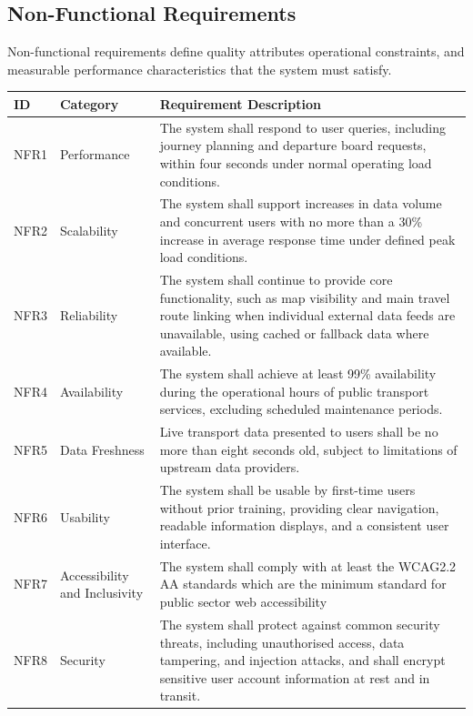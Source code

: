 \documentclass{article}
\begin{document}
\newpage

\subsection{Non-Functional Requirements}
Non-functional requirements define quality attributes operational constraints, and measurable performance characteristics that the system must satisfy. 

\begin{table}[H]
\centering
\renewcommand{\arraystretch}{1.3}
\begin{tabular}{|p{1cm}|p{3cm}|p{13cm}|}
\hline
\textbf{ID} & \textbf{Category} & \textbf{Requirement Description} \\
\hline
NFR1 & Performance &
The system shall respond to user queries, including journey planning and departure board requests, within four seconds under normal operating load conditions. \\
\hline
NFR2 & Scalability &
The system shall support increases in data volume and concurrent users with no more than a 30\% increase in average response time under defined peak load conditions. \\
\hline
NFR3 & Reliability &
The system shall continue to provide core functionality, such as map visibility and main travel route linking when individual external data feeds are unavailable, using cached or fallback data where available. \\
\hline
NFR4 & Availability &
The system shall achieve at least 99\% availability during the operational hours of public transport services, excluding scheduled maintenance periods. \\
\hline
NFR5 & Data Freshness &
Live transport data presented to users shall be no more than eight seconds old, subject to limitations of upstream data providers. \\
\hline
NFR6 & Usability &
The system shall be usable by first-time users without prior training, providing clear navigation, readable information displays, and a consistent user interface. \\
\hline
NFR7 & Accessibility and Inclusivity &
The system shall comply with at least the WCAG2.2 AA standards which are the minimum standard for public sector web accessibility \\
\hline
NFR8 & Security &
The system shall protect against common security threats, including unauthorised access, data tampering, and injection attacks, and shall encrypt sensitive user account information at rest and in transit. \\

\end{tabular}
\end{table}
\end{document}
